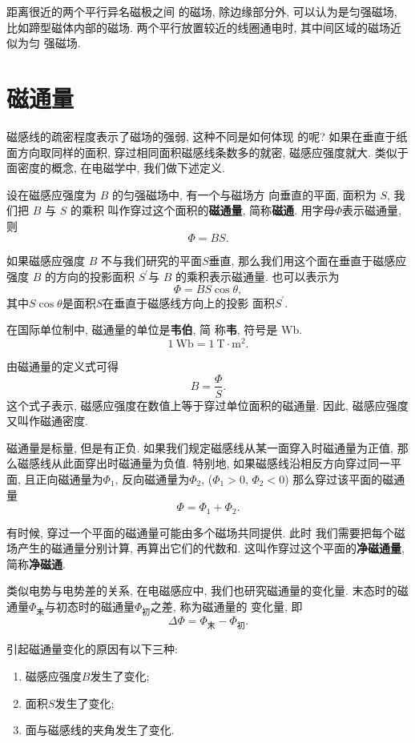 \documentclass[11pt,a4paper]{ctexbook}
\newcommand{\unit}[1]{\ \mathrm{#1}}
\begin{document}
距离很近的两个平行异名磁极之间
的磁场, 除边缘部分外, 可以认为是匀强磁场, 比如蹄型磁体内部的磁场.
两个平行放置较近的线圈通电时, 其中间区域的磁场近似为匀
强磁场.

\section{磁通量}

磁感线的疏密程度表示了磁场的强弱, 这种不同是如何体现
的呢? 如果在垂直于纸面方向取同样的面积,
穿过相同面积磁感线条数多的就密, 磁感应强度就大.
类似于面密度的概念, 在电磁学中, 我们做下述定义.


设在磁感应强度为 $B$ 的匀强磁场中, 有一个与磁场方
向垂直的平面, 面积为 $S$, 我们把 $B$ 与 $S$ 的乘积
叫作穿过这个面积的\textbf{磁通量}, 简称\textbf{磁通}.
用字母$\Phi$表示磁通量, 则$$\Phi = BS.$$

如果磁感应强度 $B$ 不与我们研究的平面$S$垂直,
那么我们用这个面在垂直于磁感应强度 $B$
的方向的投影面积 $S^{\prime}$与 $B$ 的乘积表示磁通量.
也可以表示为$$\Phi = BS\cos\theta,$$
其中$S\cos\theta$是面积$S$在垂直于磁感线方向上的投影
面积$S^{\prime}$.

在国际单位制中, 磁通量的单位是\textbf{韦伯}, 简
称\textbf{韦}, 符号是 Wb.
$$1\unit{Wb} = 1\unit{{T}\cdot{m^2}}.$$

由磁通量的定义式可得$$B = \frac{\Phi}{S}.$$这个式子表示,
磁感应强度在数值上等于穿过单位面积的磁通量. 因此, 磁感应强度又叫作磁通密度.

磁通量是标量, 但是有正负. 如果我们规定磁感线从某一面穿入时磁通量为正值,
那么磁感线从此面穿出时磁通量为负值.
特别地, 如果磁感线沿相反方向穿过同一平面, 且正向磁通量为$\Phi_1$,
反向磁通量为$\Phi_2$, ($\Phi_1>0$, $\Phi_2<0$) 那么穿过该平面的磁通量$$\Phi = \Phi_1 + \Phi_2.$$

有时候, 穿过一个平面的磁通量可能由多个磁场共同提供. 此时
我们需要把每个磁场产生的磁通量分别计算, 再算出它们的代数和.
这叫作穿过这个平面的\textbf{净磁通量}, 简称\textbf{净磁通}.

类似电势与电势差的关系, 在电磁感应中, 我们也研究磁通量的变化量.
末态时的磁通量$\Phi_\text{末}$与初态时的磁通量$\Phi_\text{初}$之差, 称为磁通量的
变化量, 即$$\Delta \Phi = \Phi_\text{末} - \Phi_\text{初}.$$

引起磁通量变化的原因有以下三种:
\begin{enumerate}
    \item 磁感应强度$B$发生了变化;
    \item 面积$S$发生了变化;
    \item 面与磁感线的夹角发生了变化.
\end{enumerate}
\end{document}
